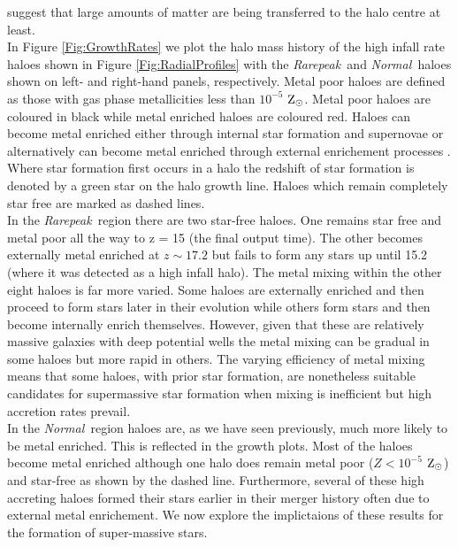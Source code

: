 \documentclass[graphics, twocolumn, usenatbib]{mn2e}
\newcommand{\zsolarc} {$\rm{Z_{\odot}}$}
\newcommand{\rarepeak} {\textit{Rarepeak~}}
\newcommand{\normal} {\textit{Normal~}}
\begin{document}
suggest that large amounts of matter are being transferred to the halo centre at least. \\
\indent In Figure \ref{Fig:GrowthRates} we plot the halo mass history of the high infall
rate haloes shown in Figure \ref{Fig:RadialProfiles} with the \rarepeak and \normal haloes
shown on left- and right-hand panels, respectively. 
Metal poor haloes are defined as those with gas phase metallicities less than
$10^{-5}$ \zsolarc. Metal poor haloes are coloured in black while metal enriched haloes are coloured
red. Haloes can become metal enriched either through internal star formation and supernovae or
alternatively can become metal enriched through external enrichement processes
\citep[e.g.][]{Smith_2015}. Where star formation first
occurs in a halo the redshift of star formation is denoted by a green star on the halo growth line. 
Haloes which remain completely star free are marked as dashed lines. \\
\indent In the \rarepeak region there are two
star-free haloes. One remains star free and metal poor all the way to z = 15 (the final output time).
The other becomes externally metal enriched at $z \sim 17.2$ but fails to form any stars up until 15.2
(where it was detected as a high infall halo). The metal mixing within the other eight haloes is far
more varied. Some haloes are externally enriched and then proceed to form stars later in their
evolution while others form stars and then become internally enrich themselves. 
However, given that these are relatively massive galaxies with deep potential wells
the metal mixing can be gradual in some haloes but more rapid in others. The varying efficiency of
metal mixing means that some haloes, with prior star formation, are nonetheless suitable candidates
for supermassive star formation when mixing is inefficient but high accretion rates prevail. \\
\indent In the \normal region haloes are, as we have seen previously, much more likely to be
metal enriched. This is reflected in the growth plots. Most of the haloes become metal enriched
although one halo does remain metal poor ($Z < 10^{-5}$ \zsolarc) and star-free as shown by the dashed
line. Furthermore, several of these high accreting haloes formed their stars earlier in their merger
history often due to external metal enrichement. We now explore the implictaions of these results for
the formation of super-massive stars. 
\end{document}
